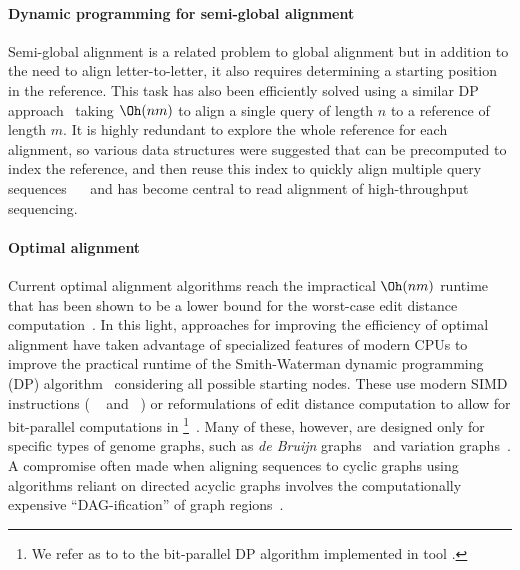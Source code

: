 \paragraph{Dynamic programming for semi-global alignment}
Semi-global alignment is a related problem to global alignment but in addition
to the need to align letter-to-letter, it also requires determining a starting
position in the reference. This task has also been efficiently solved using a
similar DP approach~\cite{sellers1980theory,smith1981identification} taking
$\Oh(nm)$ to align a single query of length $n$ to a reference of length $m$. It
is highly redundant to explore the whole reference for each alignment, so
various data structures were suggested that can be precomputed to index the
reference, and then reuse this index to quickly align multiple query sequences
~\citeyear{pearson1988improved}~\cite{pearson1988improved} and has become
central to read alignment of high-throughput sequencing.

\paragraph{Optimal alignment}
Current optimal alignment algorithms reach the impractical $\Oh(nm)$ runtime
that has been shown to be a lower bound for the worst-case edit distance
computation~\cite{backurs2015edit}. In this light, approaches for improving the
efficiency of optimal alignment have taken advantage of specialized features of
modern CPUs to improve the practical runtime of the Smith-Waterman dynamic
programming (DP) algorithm~\cite{smith_comparison_1981} considering all possible
starting nodes. These use modern SIMD instructions (\AG
\vg~\cite{garrison_variation_2018} and \pasgal~\cite{jain_accelerating_2019}) or
reformulations of edit distance computation to allow for bit-parallel
computations in \graphaligner \footnote{We refer as \bitparallel to to the
bit-parallel DP algorithm implemented in \graphaligner tool
\cite{rautiainen_bitparallel_2019}.}~\cite{rautiainen_bitparallel_2019}. Many of
these, however, are designed only for specific types of genome graphs, such as
{\itshape de Bruijn}
graphs~\cite{liu_debga_2016,limasset2019toward} and
variation graphs~\cite{garrison_variation_2018}. A compromise often made when
aligning sequences to cyclic graphs using algorithms reliant on directed acyclic
graphs involves the computationally expensive ``DAG-ification'' of graph
regions~\cite{kavya_sequence_2019,garrison_variation_2018}.

